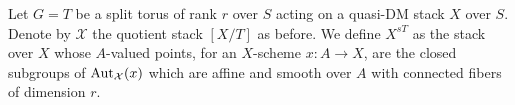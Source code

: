 \begin{definition}\label{rl-001E}\label{def:stabilizer-fixed-stack}
  Let \(G = T\) be a split torus of rank \(r\) over \(S\) acting on a quasi-DM stack \(X\) over \(S\). Denote by \(\mathcal X\) the quotient stack \([X/T]\) as before. We define \(X^{sT}\) as the stack over \(X\) whose \(A\)-valued points, for an \(X\)-scheme \(x:A\to X\), are the closed subgroups of \(\operatorname{Aut}_{\mathcal X}(x)\) which are affine and smooth over \(A\) with connected fibers of dimension \(r\).
\end{definition}

